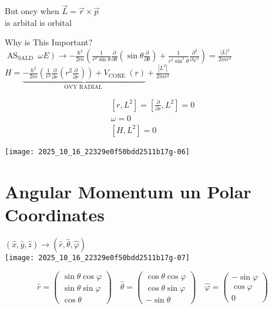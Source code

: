But oncy when $\vec{L}=\vec{r} \times \vec{p}$\\
is arbital is orbital

Why is This Important?\\
$\left.\operatorname{AS}_{\text {SALD }} \omega E\right) \rightarrow-\frac{\hbar^{2}}{2 m}\left(\frac{1}{r^{2} \sin \theta} \frac{\partial}{\partial \theta}\left(\sin \theta \frac{\partial}{\partial \theta}\right)+\frac{1}{r^{2} \sin ^{2} \theta} \frac{\partial^{2}}{\partial \varphi^{2}}\right)=\frac{|L|{ }^{2}}{2 m r^{2}}$\\
$H=\underbrace{-\frac{\hbar^{2}}{2 m}\left(\frac{1}{r^{2}} \frac{\partial}{\partial r}\left(r^{2} \frac{\partial}{\partial r}\right)\right)+V_{\text {CORE }}(r)}_{\text {OVY RADIAL }}+\frac{\left|L^{2}\right|}{2 m r^{2}}$

$$
\begin{gathered}
{\left[r, L^{2}\right]=\left[\frac{\partial}{\partial r}, L^{2}\right]=0} \\
\omega=0 \\
{\left[H, L^{2}\right]=0}
\end{gathered}
$$

\begin{center}
\texttt{[image: 2025\_10\_16\_22329e0f50bdd2511b17g-06]}
\end{center}

\section*{Angular Momentum un Polar Coordinates}
$(\hat{x}, \hat{y}, \hat{z}) \longrightarrow(\hat{r}, \hat{\theta}, \hat{\varphi})$\\
\texttt{[image: 2025\_10\_16\_22329e0f50bdd2511b17g-07]}

$$
\hat{r}=\left(\begin{array}{c}
\sin \theta \cos \varphi \\
\sin \theta \sin \varphi \\
\cos \theta
\end{array}\right) \quad \hat{\theta}=\left(\begin{array}{c}
\cos \theta \cos \varphi \\
\cos \theta \sin \varphi \\
-\sin \theta
\end{array}\right) \quad \hat{\varphi}=\left(\begin{array}{c}
-\sin \varphi \\
\cos \varphi \\
0
\end{array}\right)
$$


